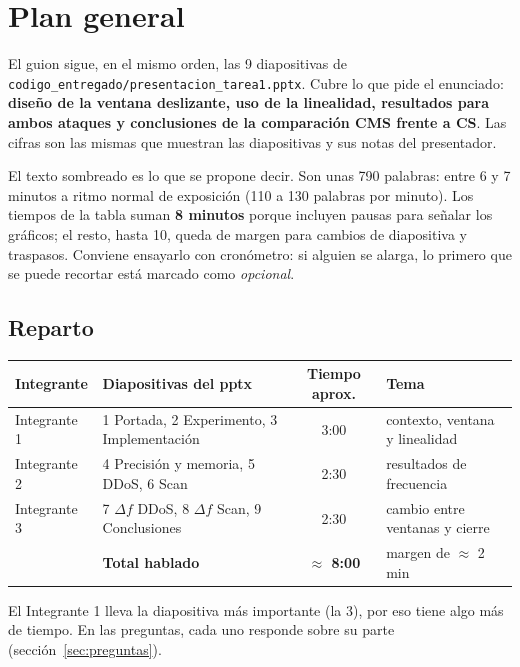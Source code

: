 \documentclass[11pt]{article}
\newcommand{\code}[1]{\texttt{#1}}
\begin{document}
\section{Plan general}

El guion sigue, en el mismo orden, las 9 diapositivas de \code{codigo\_entregado/presentacion\_tarea1.pptx}. Cubre lo que pide el enunciado: \textbf{diseño de la ventana deslizante, uso de la linealidad, resultados para ambos ataques y conclusiones de la comparación CMS frente a CS}. Las cifras son las mismas que muestran las diapositivas y sus notas del presentador.

El texto sombreado es lo que se propone decir. Son unas 790 palabras: entre 6 y 7 minutos a ritmo normal de exposición (110 a 130 palabras por minuto). Los tiempos de la tabla suman \textbf{8 minutos} porque incluyen pausas para señalar los gráficos; el resto, hasta 10, queda de margen para cambios de diapositiva y traspasos. Conviene ensayarlo con cronómetro: si alguien se alarga, lo primero que se puede recortar está marcado como \emph{opcional}.

\subsection*{Reparto}

\begin{center}
\begin{tabular}{llcl}
\toprule
Integrante & Diapositivas del pptx & Tiempo aprox. & Tema \\
\midrule
Integrante 1 & 1 Portada, 2 Experimento, 3 Implementación & 3:00 & contexto, ventana y linealidad \\
Integrante 2 & 4 Precisión y memoria, 5 DDoS, 6 Scan & 2:30 & resultados de frecuencia \\
Integrante 3 & 7 $\Delta f$ DDoS, 8 $\Delta f$ Scan, 9 Conclusiones & 2:30 & cambio entre ventanas y cierre \\
\midrule
 & \textbf{Total hablado} & \textbf{$\approx$ 8:00} & margen de $\approx$ 2 min \\
\bottomrule
\end{tabular}
\end{center}

El Integrante 1 lleva la diapositiva más importante (la 3), por eso tiene algo más de tiempo. En las preguntas, cada uno responde sobre su parte (sección~\ref{sec:preguntas}).
\end{document}
